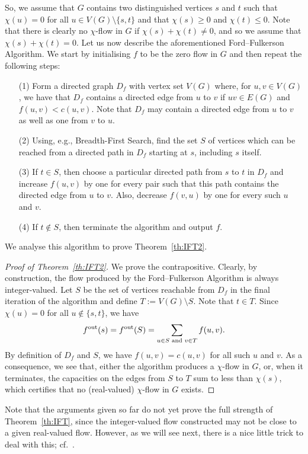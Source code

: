 \documentclass[12pt,a4paper]{amsart}
\numberwithin{equation}{section}
\theoremstyle{definition}
\begin{document}
So, we assume that $G$ contains two distinguished vertices $s$ and $t$ such that $\chi(u)=0$ for all $u\in V(G)\setminus\{s,t\}$ and that $\chi(s)\geq 0$ and $\chi(t)\leq 0$. Note that there is clearly no $\chi$-flow in $G$ if $\chi(s)+\chi(t)\neq0$, and so we assume that $\chi(s)+\chi(t)=0$. Let us now describe the aforementioned Ford--Fulkerson Algorithm. We start by initialising $f$ to be the zero flow in $G$ and then repeat the following steps:
\begin{itemize}
\item[(1)] Form a directed graph $D_f$ with vertex set $V(G)$ where, for $u,v\in V(G)$, we have that $D_f$ contains a directed edge from $u$ to $v$ if $uv\in E(G)$ and $f(u,v)<c(u,v)$. Note that $D_f$ may contain a directed edge from $u$ to $v$ as well as one from $v$ to $u$.
\item[(2)] Using, e.g., Breadth-First Search, find the set $S$ of vertices which can be reached from a directed path in $D_f$ starting at $s$, including $s$ itself.
\item[(3)] If $t\in S$, then choose a particular directed path from $s$ to $t$ in $D_f$ and increase $f(u,v)$ by one for every pair such that this path contains the directed edge from $u$ to $v$. Also, decrease $f(v,u)$ by one for every such $u$ and $v$.
\item[(4)] If $t\notin S$, then terminate the algorithm and output $f$. 
\end{itemize}
We analyse this algorithm to prove Theorem~\ref{th:IFT2}.

\begin{proof}[Proof of Theorem~\ref{th:IFT2}]
We prove the contrapositive. Clearly, by construction, the flow produced by the Ford--Fulkerson Algorithm is always integer-valued. Let $S$ be the set of vertices reachable from $D_f$ in the final iteration of the algorithm and define $T:=V(G)\setminus S$. Note that $t\in T$. Since $\chi(u)=0$ for all $u\notin \{s,t\}$, we have
\[f^{\operatorname{out}}(s) = f^{\operatorname{out}}(S) = \sum_{u\in S\text{ and }v\in T}f(u,v).\]
By definition of $D_f$ and $S$, we have $f(u,v)=c(u,v)$ for all such $u$ and $v$. As a consequence, we see that, either the algorithm produces a $\chi$-flow in $G$, or, when it terminates, the capacities on the edges from $S$ to $T$ sum to less than $\chi(s)$, which certifies that no (real-valued) $\chi$-flow in $G$ exists.
\end{proof} 

Note that the arguments given so far do not yet prove the full strength of Theorem~\ref{th:IFT}, since the integer-valued flow constructed may not be close to a given real-valued flow. However, as we will see next, there is a nice little trick to deal with this; cf.~\cite[Corollary~5.2]{MarksUnger17}. 
\end{document}
